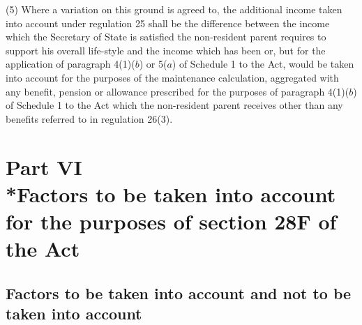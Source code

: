 \documentclass[12pt,a4paper]{article}
\begin{document}
(5) Where a variation on this ground is agreed to, the additional income taken into account under regulation 25 shall be the difference between the income which the Secretary of State is satisfied the non-resident parent requires to support his overall life-style and the income which has been or, but for the application of paragraph 4(1)($b$)  or 5($a$)  of Schedule 1 to the Act, would be taken into account for the purposes of the maintenance calculation, aggregated with any benefit, pension or allowance 
prescribed for the purposes of paragraph 4(1)($b$)  of Schedule 1 to the Act  %
which the non-resident parent receives other than any benefits referred to in regulation 26(3).


\section[Part VI --- Factors to be taken into account for the purposes of section 28F of the Act]{Part VI\\*Factors to be taken into account for the purposes of section 28F of the Act}

\renewcommand\parthead{--- Part VI}

\subsection[21. Factors to be taken into account and not to be taken into account]{Factors to be taken into account and not to be taken into account}
\end{document}
